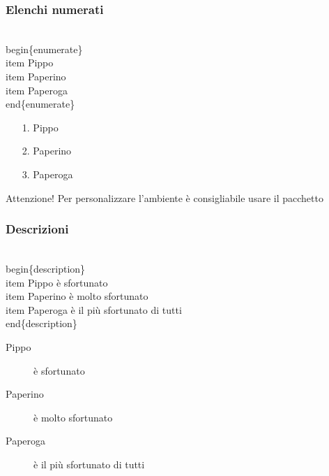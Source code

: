 \documentclass[svgnames,%
	ucs,%
	pdftex]{guitbeamer}
\begin{document}
\begin{frame}
  \frametitle{Elenchi numerati}
	\begin{LaTeXcode}
		\\begin\{\alert{enumerate}\}\n
		\hspace*{5ex}\\item Pippo \n
		\hspace*{5ex}\\item Paperino \n
		\hspace*{5ex}\\item Paperoga \n
		\\end\{\alert{enumerate}\}
	\end{LaTeXcode}
	\begin{LaTeXoutput}
		\begin{enumerate}
			\item[1.] Pippo
			\item[2.] Paperino
			\item[3.] Paperoga
		\end{enumerate}
	\end{LaTeXoutput}
	\onslide<2->
	\begin{block}{Attenzione!}
		Per personalizzare l'ambiente  \`e consigliabile
		usare il pacchetto \Lsty{enumerate}
	\end{block}
\end{frame}
\begin{frame}
  \frametitle{Descrizioni}
	\begin{LaTeXcode}
		\\begin\{\alert{description}\}\n
		\hspace*{5ex}\\item[Pippo] \`e sfortunato\n
		\hspace*{5ex}\\item[Paperino] \`e molto sfortunato\n
		\hspace*{5ex}\\item[Paperoga] \`e il pi\`u sfortunato di tutti\n
		\\end\{\alert{description}\}
	\end{LaTeXcode}
	\begin{LaTeXoutput}
		\begin{description}
			\item[Pippo] \`e sfortunato
			\item[Paperino] \`e molto sfortunato
			\item[Paperoga] \`e il pi\`u sfortunato di tutti
		\end{description}
	\end{LaTeXoutput}
\end{frame}
\end{document}
